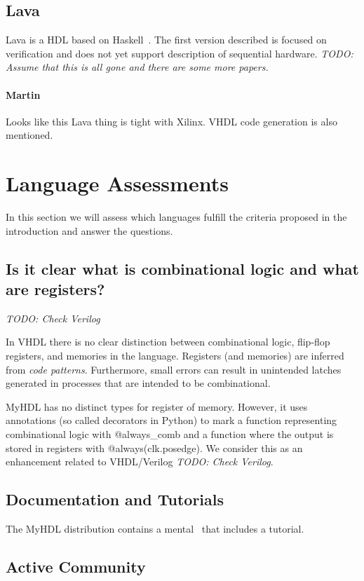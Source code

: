 \documentclass[10pt, technote, draftcls, onecolumn]{IEEEtran}
\newcommand{\code}[1]{{\small{\textsf{#1}}}}
\newcommand{\todo}[1]{{\emph{TODO: #1}}}
\newcommand{\comment}[3]{\paragraph*{\textbf{#1}}{\color{#3}#2}}
\newcommand{\martin}[1]{\comment{Martin}{#1}{Blue}}
\begin{document}
\subsection{Lava}

Lava is a HDL based on Haskell~\cite{Lava:1998}. The first version described
is focused on verification and does not yet support description of sequential
hardware. \todo{Assume that this is all gone and there are some more papers.}

\martin{Looks like this Lava thing is tight with Xilinx. VHDL code generation
is also mentioned.}

\section{Language Assessments}

In this section we will assess which languages fulfill the criteria proposed in
the introduction and answer the questions.

\subsection{Is it clear what is combinational logic and what are registers?}

\todo{Check Verilog}

In VHDL there is no clear distinction between combinational logic, flip-flop
registers,  and memories in the language. Registers (and memories) are
inferred from \emph{code patterns}. Furthermore, small errors can result
in unintended latches generated in processes that are intended to be combinational.

MyHDL has no distinct types for register of memory. However, it uses annotations
(so called decorators in Python) to mark a function representing
combinational logic with \code{@always\_comb} and a function where the
output is stored in registers with \code{@always(clk.posedge)}. We consider
this as an enhancement related to VHDL/Verilog \todo{Check Verilog}.

\subsection{Documentation and Tutorials}

The MyHDL distribution contains a mental~\cite{myhdl:2010} that includes
a tutorial.

\subsection{Active Community}
\end{document}
